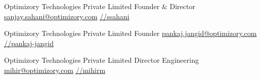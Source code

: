 
{Optimizory Technologies Private Limited}
{Founder \& Director}
{\href{mailto:sanjay.sahani@optimizory.com}{sanjay.sahani@optimizory.com}}
{\href{https://www.linkedin.com/in/ssahani}{//ssahani}}

\divider

{Optimizory Technologies Private Limited}
{Founder}
{\href{mailto:pankaj.jangid@optimizory.com}{pankaj.jangid@optimizory.com}}
{\href{https://www.linkedin.com/in/pankaj-jangid}{//pankaj-jangid}}

\divider

{Optimizory Technologies Private Limited}
{Director Engineering}
{\href{mailto:mihir@optimizory.com}{mihir@optimizory.com}}
{\href{https://www.linkedin.com/in/mihirm}{//mihirm}}


\divider

\divider



